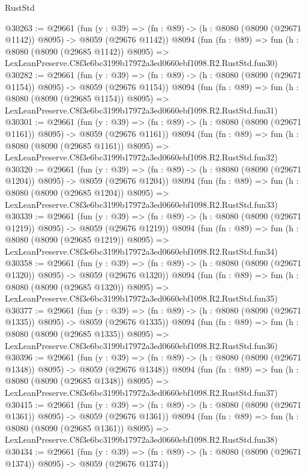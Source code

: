 \begin{lexlean}{RustStd}
\begin{coremodule}
@30263 := @29661
    (fun (y : @39) =>
    (fn : @89) -> (h : @8080 (@8090 (@29671 @1142)) @8095) -> @8059 (@29676 @1142))
    @8094
    (fun (fn : @89) =>
    fun (h : @8080 (@8090 (@29685 @1142)) @8095) =>
    LexLeanPreserve.C8f3e6bc3199b17972a3ed0660ebf1098.R2.RustStd.fun30)
@30282 := @29661
    (fun (y : @39) =>
    (fn : @89) -> (h : @8080 (@8090 (@29671 @1154)) @8095) -> @8059 (@29676 @1154))
    @8094
    (fun (fn : @89) =>
    fun (h : @8080 (@8090 (@29685 @1154)) @8095) =>
    LexLeanPreserve.C8f3e6bc3199b17972a3ed0660ebf1098.R2.RustStd.fun31)
@30301 := @29661
    (fun (y : @39) =>
    (fn : @89) -> (h : @8080 (@8090 (@29671 @1161)) @8095) -> @8059 (@29676 @1161))
    @8094
    (fun (fn : @89) =>
    fun (h : @8080 (@8090 (@29685 @1161)) @8095) =>
    LexLeanPreserve.C8f3e6bc3199b17972a3ed0660ebf1098.R2.RustStd.fun32)
@30320 := @29661
    (fun (y : @39) =>
    (fn : @89) -> (h : @8080 (@8090 (@29671 @1204)) @8095) -> @8059 (@29676 @1204))
    @8094
    (fun (fn : @89) =>
    fun (h : @8080 (@8090 (@29685 @1204)) @8095) =>
    LexLeanPreserve.C8f3e6bc3199b17972a3ed0660ebf1098.R2.RustStd.fun33)
@30339 := @29661
    (fun (y : @39) =>
    (fn : @89) -> (h : @8080 (@8090 (@29671 @1219)) @8095) -> @8059 (@29676 @1219))
    @8094
    (fun (fn : @89) =>
    fun (h : @8080 (@8090 (@29685 @1219)) @8095) =>
    LexLeanPreserve.C8f3e6bc3199b17972a3ed0660ebf1098.R2.RustStd.fun34)
@30358 := @29661
    (fun (y : @39) =>
    (fn : @89) -> (h : @8080 (@8090 (@29671 @1320)) @8095) -> @8059 (@29676 @1320))
    @8094
    (fun (fn : @89) =>
    fun (h : @8080 (@8090 (@29685 @1320)) @8095) =>
    LexLeanPreserve.C8f3e6bc3199b17972a3ed0660ebf1098.R2.RustStd.fun35)
@30377 := @29661
    (fun (y : @39) =>
    (fn : @89) -> (h : @8080 (@8090 (@29671 @1335)) @8095) -> @8059 (@29676 @1335))
    @8094
    (fun (fn : @89) =>
    fun (h : @8080 (@8090 (@29685 @1335)) @8095) =>
    LexLeanPreserve.C8f3e6bc3199b17972a3ed0660ebf1098.R2.RustStd.fun36)
@30396 := @29661
    (fun (y : @39) =>
    (fn : @89) -> (h : @8080 (@8090 (@29671 @1348)) @8095) -> @8059 (@29676 @1348))
    @8094
    (fun (fn : @89) =>
    fun (h : @8080 (@8090 (@29685 @1348)) @8095) =>
    LexLeanPreserve.C8f3e6bc3199b17972a3ed0660ebf1098.R2.RustStd.fun37)
@30415 := @29661
    (fun (y : @39) =>
    (fn : @89) -> (h : @8080 (@8090 (@29671 @1361)) @8095) -> @8059 (@29676 @1361))
    @8094
    (fun (fn : @89) =>
    fun (h : @8080 (@8090 (@29685 @1361)) @8095) =>
    LexLeanPreserve.C8f3e6bc3199b17972a3ed0660ebf1098.R2.RustStd.fun38)
@30434 := @29661
    (fun (y : @39) =>
    (fn : @89) -> (h : @8080 (@8090 (@29671 @1374)) @8095) -> @8059 (@29676 @1374))

\end{coremodule}
\end{lexlean}

